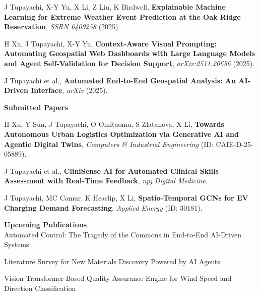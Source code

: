\documentclass[10pt, letterpaper]{article}
\begin{document}
\noindent J Tupayachi, X-Y Yu, X Li, Z Liu, K Birdwell, \textbf{Explainable Machine Learning for Extreme Weather Event Prediction at the Oak Ridge Reservation}, \textit{SSRN 6409258} (2025).

\noindent H Xu, J Tupayachi, X-Y Yu, \textbf{Context-Aware Visual Prompting: Automating Geospatial Web Dashboards with Large Language Models and Agent Self-Validation for Decision Support}, \textit{arXiv:2511.20656} (2025).

\noindent J Tupayachi et al., \textbf{Automated End-to-End Geospatial Analysis: An AI-Driven Interface}, \textit{arXiv} (2025).


\vspace{0.2cm}
\noindent\textbf{Submitted Papers}

\noindent H Xu, Y Sun, J Tupayachi, O Omitaomu, S Zlatanova, X Li, \textbf{Towards Autonomous Urban Logistics Optimization via Generative AI and Agentic Digital Twins}, \textit{Computers \& Industrial Engineering} (ID: CAIE-D-25-05889).

\noindent J Tupayachi et al., \textbf{CliniSense AI for Automated Clinical Skills Assessment with Real-Time Feedback}, \textit{npj Digital Medicine}.

\noindent J Tupayachi, MC Camur, K Heaslip, X Li, \textbf{Spatio-Temporal GCNs for EV Charging Demand Forecasting}, \textit{Applied Energy} (ID: 30181).


\vspace{0.2cm}
\noindent\textbf{Upcoming Publications}\\
\noindent Automated Control: The Tragedy of the Commons in End-to-End AI-Driven Systems

\noindent Literature Survey for New Materials Discovery Powered by AI Agents

\noindent Vision Transformer-Based Quality Assurance Engine for Wind Speed and Direction Classification





\vspace{0.3em}
\end{document}

